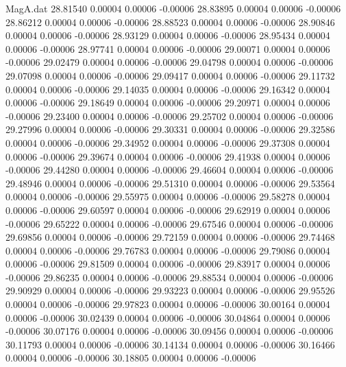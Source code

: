 \begin{filecontents}{MagA.dat}
  28.81540    0.00004    0.00006   -0.00006
  28.83895    0.00004    0.00006   -0.00006
  28.86212    0.00004    0.00006   -0.00006
  28.88523    0.00004    0.00006   -0.00006
  28.90846    0.00004    0.00006   -0.00006
  28.93129    0.00004    0.00006   -0.00006
  28.95434    0.00004    0.00006   -0.00006
  28.97741    0.00004    0.00006   -0.00006
  29.00071    0.00004    0.00006   -0.00006
  29.02479    0.00004    0.00006   -0.00006
  29.04798    0.00004    0.00006   -0.00006
  29.07098    0.00004    0.00006   -0.00006
  29.09417    0.00004    0.00006   -0.00006
  29.11732    0.00004    0.00006   -0.00006
  29.14035    0.00004    0.00006   -0.00006
  29.16342    0.00004    0.00006   -0.00006
  29.18649    0.00004    0.00006   -0.00006
  29.20971    0.00004    0.00006   -0.00006
  29.23400    0.00004    0.00006   -0.00006
  29.25702    0.00004    0.00006   -0.00006
  29.27996    0.00004    0.00006   -0.00006
  29.30331    0.00004    0.00006   -0.00006
  29.32586    0.00004    0.00006   -0.00006
  29.34952    0.00004    0.00006   -0.00006
  29.37308    0.00004    0.00006   -0.00006
  29.39674    0.00004    0.00006   -0.00006
  29.41938    0.00004    0.00006   -0.00006
  29.44280    0.00004    0.00006   -0.00006
  29.46604    0.00004    0.00006   -0.00006
  29.48946    0.00004    0.00006   -0.00006
  29.51310    0.00004    0.00006   -0.00006
  29.53564    0.00004    0.00006   -0.00006
  29.55975    0.00004    0.00006   -0.00006
  29.58278    0.00004    0.00006   -0.00006
  29.60597    0.00004    0.00006   -0.00006
  29.62919    0.00004    0.00006   -0.00006
  29.65222    0.00004    0.00006   -0.00006
  29.67546    0.00004    0.00006   -0.00006
  29.69856    0.00004    0.00006   -0.00006
  29.72159    0.00004    0.00006   -0.00006
  29.74468    0.00004    0.00006   -0.00006
  29.76783    0.00004    0.00006   -0.00006
  29.79086    0.00004    0.00006   -0.00006
  29.81509    0.00004    0.00006   -0.00006
  29.83917    0.00004    0.00006   -0.00006
  29.86235    0.00004    0.00006   -0.00006
  29.88534    0.00004    0.00006   -0.00006
  29.90929    0.00004    0.00006   -0.00006
  29.93223    0.00004    0.00006   -0.00006
  29.95526    0.00004    0.00006   -0.00006
  29.97823    0.00004    0.00006   -0.00006
  30.00164    0.00004    0.00006   -0.00006
  30.02439    0.00004    0.00006   -0.00006
  30.04864    0.00004    0.00006   -0.00006
  30.07176    0.00004    0.00006   -0.00006
  30.09456    0.00004    0.00006   -0.00006
  30.11793    0.00004    0.00006   -0.00006
  30.14134    0.00004    0.00006   -0.00006
  30.16466    0.00004    0.00006   -0.00006
  30.18805    0.00004    0.00006   -0.00006

\end{filecontents}
